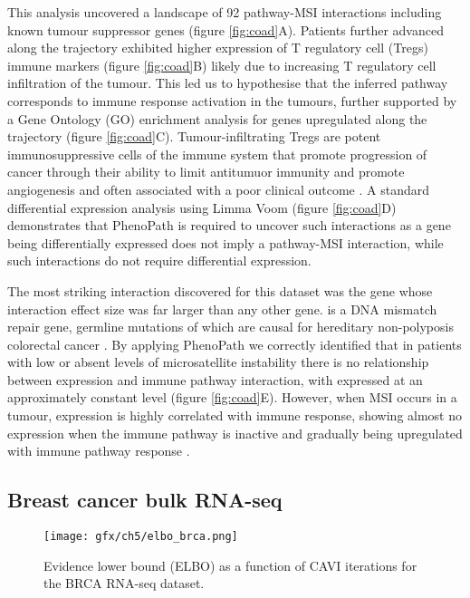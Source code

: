 This analysis uncovered a landscape of 92 pathway-MSI interactions including known tumour suppressor genes (figure \ref{fig:coad}A).
Patients further advanced along the trajectory exhibited higher expression of T regulatory cell (Tregs) immune markers (figure \ref{fig:coad}B) likely due to increasing T regulatory cell infiltration of the tumour.
This led us to hypothesise that the inferred pathway corresponds to immune response activation in the tumours, further supported by a Gene Ontology (GO) enrichment analysis for genes upregulated along the trajectory   (figure \ref{fig:coad}C).
Tumour-infiltrating Tregs are potent immunosuppressive cells of the immune system that promote progression of cancer through their ability to limit antitumuor immunity and promote angiogenesis and often associated with a poor clinical outcome \cite{facciabene2012t}.
A standard differential expression analysis using Limma Voom \cite{Law2014-tu} (figure \ref{fig:coad}D) demonstrates that PhenoPath is required to uncover such interactions as a gene being differentially expressed does not imply a pathway-MSI interaction, while such interactions do not require differential expression.

The most striking interaction discovered for this dataset was the \mlh gene whose interaction effect size was far larger than any other gene.
\mlh is a DNA mismatch repair gene, germline mutations of which are causal for hereditary non-polyposis colorectal cancer \cite{Bonadona2011-ml,Gille2002-rx}.  By applying PhenoPath we correctly identified that in patients with low or absent levels of microsatellite instability there is no relationship between \mlh expression and immune pathway interaction, with \mlh expressed at an approximately constant level (figure \ref{fig:coad}E). However, when MSI occurs in a tumour, \mlh expression is highly correlated with immune response, showing almost no expression when the immune pathway is inactive and gradually being upregulated with immune pathway response \cite{michel2008high}.

\subsection{Breast cancer bulk RNA-seq} \label{sec:brca}

\begin{figure}
\centering
\texttt{[image: gfx/ch5/elbo\_brca.png]}
\caption{Evidence lower bound (ELBO) as a function of CAVI iterations for the BRCA RNA-seq dataset.}\label{fig:elbo_brca}
\end{figure}

